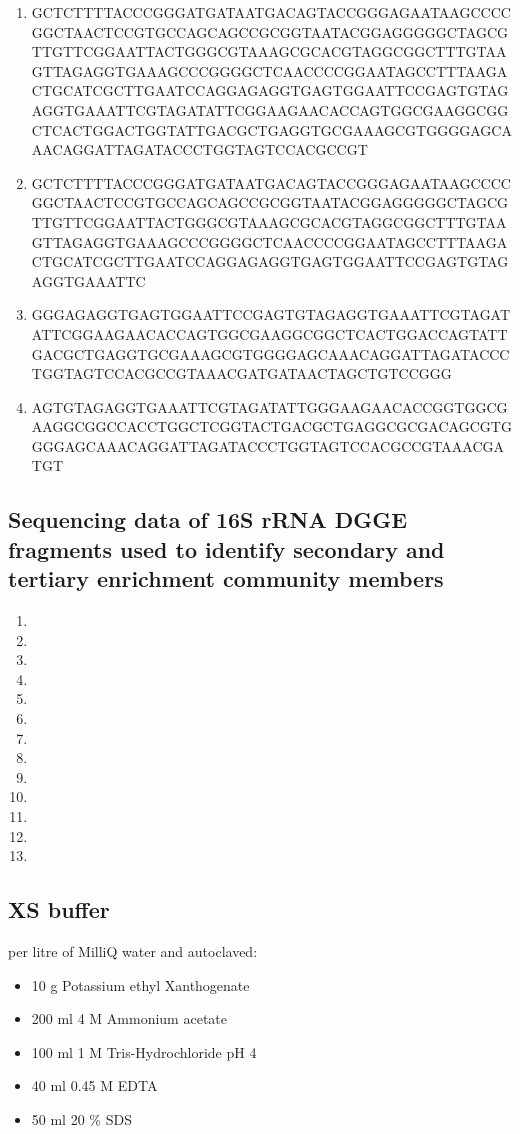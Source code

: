 \documentclass{article}
\begin{document}
\begin{enumerate}
\item GCTCTTTTACCCGGGATGATAATGACAGTACCGGGAGAATAAGCCCCGGCTAACTCCGTGCCAGCAGCCGCGGTAATACGGAGGGGGCTAGCGTTGTTCGGAATTACTGGGCGTAAAGCGCACGTAGGCGGCTTTGTAAGTTAGAGGTGAAAGCCCGGGGCTCAACCCCGGAATAGCCTTTAAGACTGCATCGCTTGAATCCAGGAGAGGTGAGTGGAATTCCGAGTGTAGAGGTGAAATTCGTAGATATTCGGAAGAACACCAGTGGCGAAGGCGGCTCACTGGACTGGTATTGACGCTGAGGTGCGAAAGCGTGGGGAGCAAACAGGATTAGATACCCTGGTAGTCCACGCCGT
\item GCTCTTTTACCCGGGATGATAATGACAGTACCGGGAGAATAAGCCCCGGCTAACTCCGTGCCAGCAGCCGCGGTAATACGGAGGGGGCTAGCGTTGTTCGGAATTACTGGGCGTAAAGCGCACGTAGGCGGCTTTGTAAGTTAGAGGTGAAAGCCCGGGGCTCAACCCCGGAATAGCCTTTAAGACTGCATCGCTTGAATCCAGGAGAGGTGAGTGGAATTCCGAGTGTAGAGGTGAAATTC
\item GGGAGAGGTGAGTGGAATTCCGAGTGTAGAGGTGAAATTCGTAGATATTCGGAAGAACACCAGTGGCGAAGGCGGCTCACTGGACCAGTATTGACGCTGAGGTGCGAAAGCGTGGGGAGCAAACAGGATTAGATACCCTGGTAGTCCACGCCGTAAACGATGATAACTAGCTGTCCGGG 
\item AGTGTAGAGGTGAAATTCGTAGATATTGGGAAGAACACCGGTGGCGAAGGCGGCCACCTGGCTCGGTACTGACGCTGAGGCGCGACAGCGTGGGGAGCAAACAGGATTAGATACCCTGGTAGTCCACGCCGTAAACGATGT
\end{enumerate}

\subsection{Sequencing data of 16S rRNA DGGE fragments used to identify secondary and tertiary enrichment community members}
\begin{enumerate}
\item 
\item 
\item 
\item 
\item 
\item 
\item 
\item 
\item 
\item 
\item 
\item 
\item 
\end{enumerate}

\subsection{XS buffer}
per litre of MilliQ water and autoclaved:
\begin{itemize}
\item 10 g Potassium ethyl Xanthogenate
\item 200 ml 4 M Ammonium acetate
\item 100 ml 1 M Tris-Hydrochloride pH 4
\item 40 ml 0.45 M EDTA
\item 50 ml 20 \% SDS
 
\end{itemize}
\end{document}
